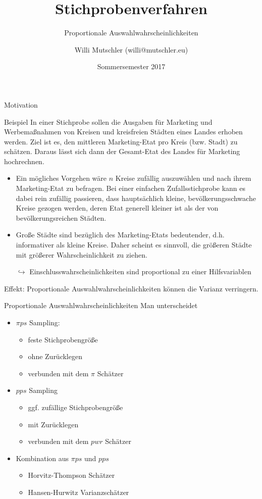 \documentclass[9pt]{beamer}
\title{Stichprobenverfahren}
\subtitle{Proportionale Auswahlwahrscheinlichkeiten}
\date[SS2017]{Sommersemester 2017}
\author{Willi Mutschler (willi@mutschler.eu)}
\begin{document}
\maketitle

\begin{frame}{Motivation}\small
\begin{block}{Beispiel}
In einer Stichprobe sollen die Ausgaben für Marketing und Werbemaßnahmen von Kreisen und kreisfreien Städten eines Landes erhoben werden. Ziel ist es, den mittleren Marketing-Etat pro Kreis (bzw. Stadt) zu schätzen. Daraus lässt sich dann der Gesamt-Etat des Landes für Marketing hochrechnen. 
\begin{itemize}
	\item Ein mögliches Vorgehen wäre $n$ Kreise zufällig auszuwählen und nach ihrem Marketing-Etat zu befragen. Bei einer einfachen Zufallsstichprobe kann es dabei rein zufällig passieren, dass hauptsächlich kleine, bevölkerungsschwache Kreise gezogen werden, deren Etat generell kleiner ist als der von bevölkerungsreichen Städten.
	\item Große Städte sind bezüglich des Marketing-Etats bedeutender, d.h. informativer als kleine Kreise. Daher scheint es sinnvoll, die größeren Städte mit größerer Wahrscheinlichkeit zu ziehen.
	\item[$\hookrightarrow$] Einschlusswahrscheinlichkeiten sind proportional zu einer Hilfsvariablen
\end{itemize}
\end{block}
Effekt: Proportionale Auswahlwahrscheinlichkeiten können die Varianz verringern.
\end{frame}

\begin{frame}{Proportionale Auswahlwahrscheinlichkeiten}
Man unterscheidet
\begin{itemize}
	\item $\pi ps$ Sampling: 
	\begin{itemize}
		\item feste Stichprobengröße
		\item ohne Zurücklegen
		\item verbunden mit dem $\pi$ Schätzer 
	\end{itemize}
	\item $pps$ Sampling
	\begin{itemize}
		\item ggf. zufällige Stichprobengröße
		\item mit Zurücklegen
		\item verbunden mit dem $pwr$ Schätzer
	\end{itemize}
	\item Kombination aus $\pi ps$ und $pps$
	\begin{itemize}
		\item Horvitz-Thompson Schätzer
		\item Hansen-Hurwitz Varianzschätzer
	\end{itemize}
\end{itemize}
\end{frame}
\end{document}
